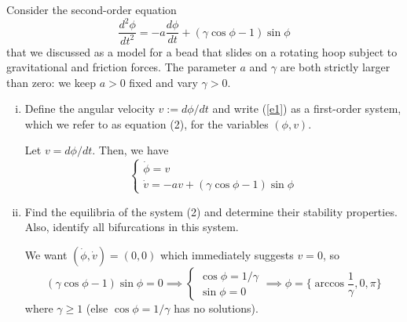 \documentclass[12pt]{article}
\begin{document}
Consider the second-order equation
\begin{equation}\label{e1}
    \frac{d^2\phi}{d t^2} = - a \frac{d\phi}{d t} + (\gamma\cos\phi-1) \sin\phi
\end{equation}
that we discussed as a model for a bead that slides on a rotating hoop subject to gravitational and friction forces. The parameter $a$ and $\gamma$ are both strictly larger than zero: we keep $a>0$ fixed and vary $\gamma>0$.
\begin{enumerate}[(i)]
    \item Define the angular velocity $v:=d\phi/d t$ and write (\ref{e1}) as a first-order system, which we refer to as equation (2), for the variables $(\phi,v)$.

          \color{blue}
          Let $v = d\phi/dt$. Then, we have
          \[\begin{cases}
                  \dot \phi = v \\
                  \dot v = -av + (\gamma\cos\phi - 1)\sin\phi
              \end{cases}\]

          \color{black}

    \item Find the equilibria of the system (2) and determine their stability properties. Also, identify all bifurcations in this system.

          \color{blue}
          We want $(\dot \phi, \dot v) = (0, 0)$ which immediately suggests $v = 0$, so
          \[(\gamma \cos \phi - 1) \sin \phi = 0 \implies \begin{cases}
                  \cos \phi = 1/\gamma \\
                  \sin \phi = 0
              \end{cases} \implies \phi = \{\arccos \frac{1}{\gamma}, 0, \pi\}\]
          where $\gamma \geq 1$ (else $\cos \phi = 1/\gamma$ has no solutions).


\end{enumerate}
\end{document}
